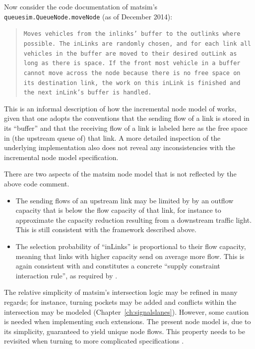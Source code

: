 Now consider the code documentation of \gls{matsim}'s \lstinline|queuesim.QueueNode.moveNode|
(as of December 2014):
\begin{quote}
\noindent \texttt{Moves vehicles from the inlinks' buffer to the outlinks
where possible. The inLinks are randomly chosen, and for each link
all vehicles in the buffer are moved to their desired outLink as long
as there is space. If the front most vehicle in a buffer cannot move
across the node because there is no free space on its destination
link, the work on this inLink is finished and the next inLink's buffer
is handled.}
\end{quote}
This is an informal description of how the incremental node model
of \citet{floetteroed-2011a} works, given that one adopts the conventions
that the sending flow of a link is stored in its {}``buffer'' and
that the receiving flow of a link is labeled here as the free space
in (the upstream queue of) that link. A more detailed inspection of
the underlying implementation also does not reveal any inconsistencies
with the incremental node model specification.

There are two aspects of the \gls{matsim} node model that is not reflected
by the above code comment.
\begin{itemize}\styleItemize
\item The sending flows of an upstream link may be limited by by an outflow
capacity that is below the flow capacity  of
that link, for instance to approximate the capacity reduction resulting
from a downstream traffic light. This is still consistent with the
framework described above.
\item The selection probability of {}``inLinks'' is proportional to their
flow capacity, meaning that links with higher capacity send on average
more flow. This is again consistent with \citet{floetteroed-2011a}
and constitutes a concrete {}``supply constraint interaction rule'',
as required by \citet{tampere-2010b}.
\end{itemize}
The relative simplicity of \gls{matsim}'s intersection logic may be refined
in many regards; for instance, turning pockets may be added and conflicts
within the intersection may be modeled (\cf Chapter~\ref{ch:signalslanes}). 
However, some caution is needed when implementing such extensions.
The present node model is, due to its simplicity, guaranteed to yield
unique node flows. This property needs to be revisited when turning
to more complicated specifications \citep{corthout-2012}.


